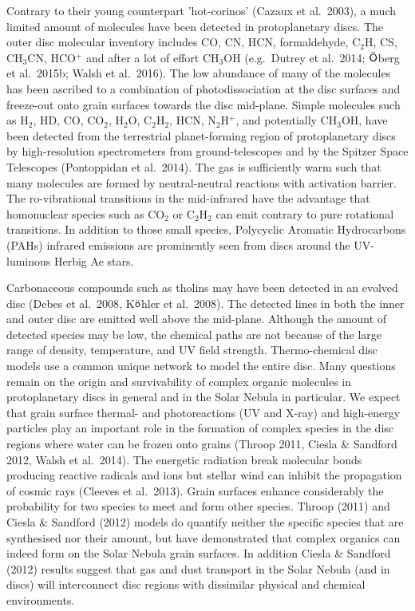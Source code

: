 \documentclass[10pt,fleqn,twoside]{article}
\begin{document}
Contrary to their young counterpart 'hot-corinos' (Cazaux et al.\ 2003), a much limited amount of molecules have been detected in protoplanetary discs. The outer disc molecular inventory includes CO, CN, HCN, formaldehyde, C$_2$H, CS, CH$_3$CN, HCO$^+$ and after a lot of effort CH$_3$OH (e.g.\ Dutrey et al.\ 2014;  $\ddot{\textsf O}$berg et al.\ 2015b; Walsh et al.\ 2016). The low abundance of many of the molecules has been ascribed to a combination of photodissociation at the disc surfaces and freeze-out onto grain surfaces towards the disc mid-plane. Simple molecules such as H$_2$, HD, CO, CO$_2$, H$_2$O, C$_2$H$_2$, HCN, N$_2$H$^+$, and potentially CH$_3$OH, have been detected from the terrestrial planet-forming region of protoplanetary discs by high-resolution spectrometers from ground-telescopes and by the Spitzer Space Telescopes (Pontoppidan et al.\ 2014). The gas is sufficiently warm such that many molecules are formed by neutral-neutral reactions with activation barrier. The ro-vibrational transitions in the mid-infrared have the advantage that homonuclear species such as CO$_2$ or C$_2$H$_2$ can emit contrary to pure rotational transitions. In addition to those small species, Polycyclic Aromatic Hydrocarbons (PAHs) infrared emissions are prominently seen from discs around the UV-luminous Herbig Ae stars. 

Carbonaceous compounds such as tholins may have been detected in an evolved disc (Debes et al.\ 2008, K$\ddot{\textsf o}$hler et al.\ 2008). The detected lines in both the inner and outer disc are emitted well above the mid-plane. Although the amount of detected species may be low, the chemical paths are not because of the large range of density, temperature, and UV field strength. Thermo-chemical disc models use a common unique network to model the entire disc. Many questions remain on the origin and survivability of complex organic molecules in protoplanetary discs in general and in the Solar Nebula in particular. We expect that grain surface thermal- and photoreactions (UV and X-ray) and high-energy particles play an important role in the formation of complex species in the disc regions where water can be frozen onto grains (Throop 2011, Ciesla \& Sandford 2012, Walsh et al.\ 2014). The energetic radiation break molecular bonds producing reactive radicals and ions but stellar wind can inhibit the propagation of cosmic rays (Cleeves et al.\ 2013). Grain surfaces enhance considerably the probability for two species to meet and form other species. Throop (2011) and Ciesla \& Sandford (2012) models do quantify neither the specific species that are synthesised nor their amount, but have demonstrated that complex organics can indeed form on the Solar Nebula grain surfaces. In addition Ciesla \& Sandford (2012) results suggest that gas and dust transport in the Solar Nebula (and in discs) will interconnect disc regions with dissimilar physical and chemical environments.
\end{document}
